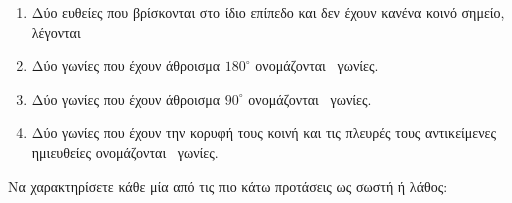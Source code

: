 \documentclass[12pt,a4page]{article}
\def\multichoiceskip{\vspace{2ex}}
\def\blank{\lowerdots[0ex]{10}}
\begin{document}
\begin{exercise}
\begin{enumerate}[label=\arabic*.,leftmargin=14pt]
    \multichoiceskip
  \item Δύο ευθείες που βρίσκονται στο ίδιο επίπεδο και δεν έχουν κανένα κοινό σημείο, λέγονται \blank
    

    \multichoiceskip
  \item Δύο γωνίες που έχουν άθροισμα $180^\circ$ ονομάζονται \blank\ γωνίες.
    
    
    \multichoiceskip
  \item Δύο γωνίες που έχουν άθροισμα $90^\circ$ ονομάζονται \blank\ γωνίες.
    
    
    \multichoiceskip
  \item Δύο γωνίες που έχουν την κορυφή τους κοινή και τις πλευρές τους αντικείμενες ημιευθείες ονομάζονται \blank\ γωνίες.
    

  \end{enumerate}
\item Να χαρακτηρίσετε κάθε μία από τις πιο κάτω προτάσεις ως σωστή ή λάθος:


\end{exercise}
\end{document}
